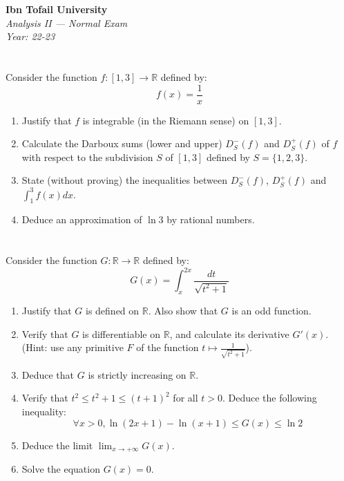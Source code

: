 \documentclass[12pt]{article}
\begin{document}
\begin{center}
  \Large\textbf{Ibn Tofail University} \\[1em]
  \large\textit{Analysis II — Normal Exam} \\[0.5em]
  \large\textit{Year: 22-23} \\[2em]
\end{center}

\vspace{0.5cm}

\section{}
Consider the function $f: [1, 3] \to \mathbb{R}$ defined by:
$$f(x) = \frac{1}{x}$$

\begin{enumerate}
    \item Justify that $f$ is integrable (in the Riemann sense) on $[1, 3]$.
    \item Calculate the Darboux sums (lower and upper) $D^-_S(f)$ and $D^+_S(f)$ of $f$ with respect to the subdivision $S$ of $[1, 3]$ defined by $S = \{1, 2, 3\}$.
    \item State (without proving) the inequalities between $D^-_S(f)$, $D^+_S(f)$ and $\int_1^3 f(x) dx$.
    \item Deduce an approximation of $\ln 3$ by rational numbers.
\end{enumerate}

\newpage

\begin{answerbox}


\end{answerbox}

\newpage

\section{}
Consider the function $G: \mathbb{R} \to \mathbb{R}$ defined by:
$$G(x) = \int_x^{2x} \frac{dt}{\sqrt{t^2 + 1}}$$

\begin{enumerate}
    \item Justify that $G$ is defined on $\mathbb{R}$. Also show that $G$ is an odd function.
    \item Verify that $G$ is differentiable on $\mathbb{R}$, and calculate its derivative $G'(x)$. (Hint: use any primitive $F$ of the function $t \mapsto \frac{1}{\sqrt{t^2 + 1}}$).
    \item Deduce that $G$ is strictly increasing on $\mathbb{R}$.
    \item Verify that $t^2 \leq t^2 + 1 \leq (t + 1)^2$ for all $t > 0$. Deduce the following inequality:
    $$\forall x > 0, \ln(2x + 1) - \ln(x + 1) \leq G(x) \leq \ln 2$$
    \item Deduce the limit $\lim_{x\to +\infty} G(x)$.
    \item Solve the equation $G(x) = 0$.
\end{enumerate}
\end{document}
